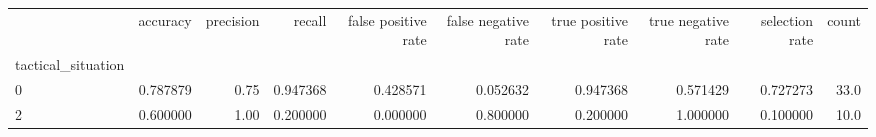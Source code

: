 \begin{tabular}{lrrrrrrrrr}
\toprule
{} &  accuracy &  precision &    recall &  false positive rate &  false negative rate &  true positive rate &  true negative rate &  selection rate &  count \\
tactical\_situation &           &            &           &                      &                      &                     &                     &                 &        \\
\midrule
0                  &  0.787879 &       0.75 &  0.947368 &             0.428571 &             0.052632 &            0.947368 &            0.571429 &        0.727273 &   33.0 \\
2                  &  0.600000 &       1.00 &  0.200000 &             0.000000 &             0.800000 &            0.200000 &            1.000000 &        0.100000 &   10.0 \\
\bottomrule
\end{tabular}
